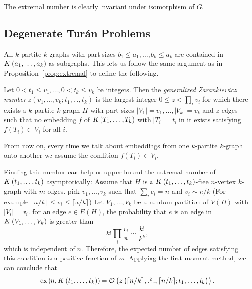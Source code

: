 \begin{remark}
    The extremal number is clearly invariant under isomorphism of $G$.
\end{remark}

\subsection{Degenerate Turán Problems}\label{subsec:degenerate}

\begin{remark}
    All $k$-partite $k$-graphs with part sizes $b_1 \leq a_1, \dots, b_k \leq a_k$
    are contained in $K\left(a_1, \dots, a_k\right)$ as subgraphs.
    This lets us follow the same argument as in Proposition~\ref{prop:extremal}
    to define the following.
\end{remark}

\begin{definition}\label{def:zarankiewicz}
    Let $0 < t_1 \leq v_1, \dots, 0 < t_k \leq v_k$ be integers.
    Then the \emph{generalized Zarankiewicz number} $z(v_1, \dots, v_k; t_1, \dots, t_k)$
    is the largest integer $0 \leq z < \prod_i{ v_i}$ for which there exists a $k$-partite $k$-graph
    $H$ with part sizes $ |V_1| = v_1, \dots, |V_k| = v_k$ and $z$ edges
    such that no embedding $f$ of $K\left(T_1, \dots, T_k\right)$ with $|T_i| = t_i$ in it exists
    satisfying $f(T_i) \subset V_i$ for all $i$.
\end{definition}

From now on, every time we talk about embeddings from one $k$-partite $k$-graph
onto another we assume the condition $f(T_i) \subset V_i$.

\begin{remark}\label{rem:zar_vs_turan}
    Finding this number can help us upper bound the extremal number of $K\left(t_1, \dots, t_k\right)$ asymptotically:
    Assume that $H$ is a $K\left(t_1, \dots, t_k\right)$-free $n$-vertex $k$-graph with $m$ edges.
    pick $v_1, \dots, v_k$ such that $\sum_{i} v_i = n $ and $v_i \sim n/k $
    (For example $\lfloor n/k \rfloor \leq v_i \leq \lceil n/k \rceil$)
    Let $V_1, \dots, V_k$ be a random partition of $V(H)$ with $|V_i| = v_i$.
    for an edge $e \in E(H)$, the probability that $e$ is an edge in $K\left(V_1, \dots, V_k\right)$ is
    greater than
    \[k! \prod_i \frac{v_i}{n} \sim \frac{k!}{k^k},\]
    which is independent of $n$.
    Therefore, the expected number of edges satisfying this condition is a positive fraction of $m$.
    Applying the first moment method, we can conclude that
    \[
        \text{ex} \left( n, K\left(t_1, \dots, t_k\right) \right) = \mathcal{O}\left(z\left(\lceil n / k \rceil, \overset{k}{\dots}, \lceil n / k \rceil; t_1, \dots, t_k\right)\right).
    \]

\end{remark}


